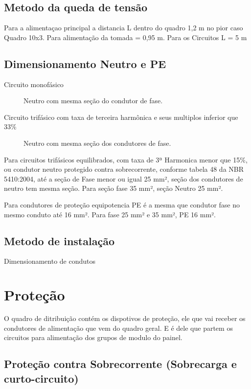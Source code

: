 \subsection{ Metodo da queda de tensão}
Para a alimentaçao principal a distancia L dentro do quadro 1,2 m no pior caso Quadro 10x3.  Para alimentação da tomada = 0,95 m. Para os Circuitos L = 5 m


\subsection{Dimensionamento Neutro e PE}

\begin{description}
\item[Circuito monofásico] Neutro com mesma seção do condutor de fase.
\item[Circuito trifásico com taxa de terceira harmônica e seus multiplos inferior que  33\%]  Neutro com mesma seção dos condutores de fase.
\end{description}
Para circuitos trifásicos equilibrados, com taxa de 3ª Harmonica menor que 15\%, ou condutor neutro protegido contra sobrecorrente, conforme tabela 48 da NBR 5410:2004, até a seção de Fase menor ou igual 25 mm², seção dos condutores de  neutro tem mesma seção. Para seção fase 35 mm², seção Neutro 25 mm². 

Para condutores de proteção equipotencia PE é a mesma que condutor fase no mesmo conduto até 16 mm². Para fase 25 mm² e 35 mm², PE 16 mm². 


\subsection{ Metodo de instalação}

Dimensionamento de condutos
\section{ Proteção}
O quadro de ditribuição contém os dispotivos de proteção, ele que vai receber os condutores de alimentação que vem do quadro geral. E é dele que partem os circuitos para alimentação dos grupos de modulo do painel. 



\subsection{Proteção contra Sobrecorrente (Sobrecarga e curto-circuito)}


